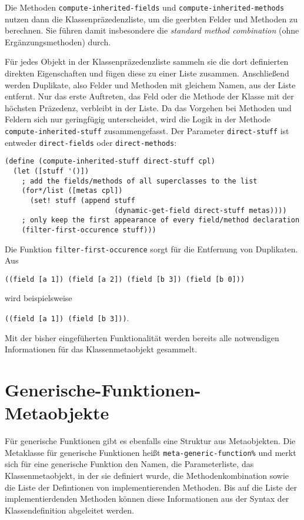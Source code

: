 Die Methoden \texttt{compute-inherited-fields} und \texttt{compute-inherited-methods} nutzen dann die Klassenpräzedenzliste, um die geerbten Felder und Methoden zu berechnen. Sie führen damit insbesondere die \textit{standard method combination} (ohne Ergänzungsmethoden) durch.

Für jedes Objekt in der Klassenpräzedenzliste sammeln sie die dort definierten direkten Eigenschaften und fügen diese zu einer Liste zusammen. Anschließend werden Duplikate, also Felder und Methoden mit gleichem Namen, aus der Liste entfernt. Nur das erste Auftreten, das Feld oder die Methode der Klasse mit der höchsten Präzedenz, verbleibt in der Liste. Da das Vorgehen bei Methoden und Feldern sich nur geringfügig unterscheidet, wird die Logik in der Methode \texttt{compute-inherited-stuff} zusammengefasst. Der Parameter \texttt{direct-stuff} ist entweder \texttt{{\textquotesingle}direct-fields} oder \texttt{{\textquotesingle}direct-methods}:

\begin{lstlisting}
(define (compute-inherited-stuff direct-stuff cpl)
  (let ([stuff '()])
    ; add the fields/methods of all superclasses to the list
    (for*/list ([metas cpl])
      (set! stuff (append stuff 
                          (dynamic-get-field direct-stuff metas))))
    ; only keep the first appearance of every field/method declaration
    (filter-first-occurence stuff)))
\end{lstlisting}

Die Funktion \texttt{filter-first-occurence} sorgt für die Entfernung von Duplikaten. Aus

\texttt{\textquotesingle((field [a 1]) (field [a 2]) (field [b 3]) (field [b 0]))}

wird beispielsweise

\texttt{\textquotesingle((field [a 1]) (field [b 3]))}.

Mit der bisher eingefüherten Funktionalität werden bereits alle notwendigen Informationen für das Klassenmetaobjekt gesammelt.

\section{Generische-Funktionen-Metaobjekte}
Für generische Funktionen gibt es ebenfalls eine Struktur aus Metaobjekten. Die Metaklasse für generische Funktionen heißt \texttt{meta-generic-function\%} und merkt sich für eine generische Funktion den Namen, die Parameterliste, das Klassenmetaobjekt, in der sie definiert wurde, die Methodenkombination sowie die Liste der Defintionen von implementierenden Methoden. Bis auf die Liste der implementierdenden Methoden können diese Informationen aus der Syntax der Klassendefinition abgeleitet werden.

